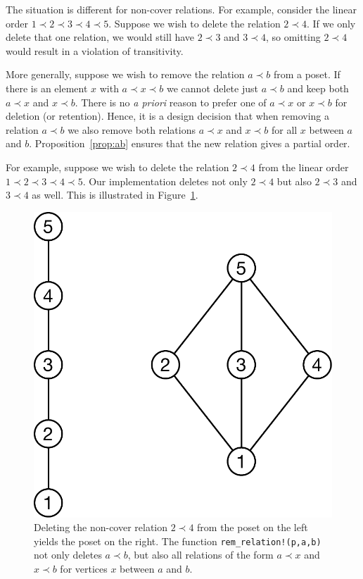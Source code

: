 \documentclass[12pt]{article}
\begin{document}
The situation is different for non-cover relations. For example,
consider the linear order $1\prec2\prec3\prec4\prec5$. Suppose we
wish to delete the relation $2\prec4$. If we only delete that one
relation, we would still have $2\prec3$ and $3\prec4$, so omitting
$2\prec4$ would result in a violation of transitivity. 

More generally, suppose we wish to remove the relation $a\prec b$ from
a poset. If there is an element $x$ with $a\prec x\prec b$ we cannot
delete just $a\prec b$ and keep both $a \prec x$ and $x\prec b$. There
is no \emph{a priori} reason to prefer one of $a\prec x$ or $x \prec
b$ for deletion (or retention). Hence, it is a design decision that
when removing a relation $a \prec b$ we also remove both relations $a
\prec x$ and $x \prec b$ for all $x$ between $a$ and
$b$. Proposition~\ref{prop:ab} ensures that the new relation gives a
partial order. 

For example, suppose we wish to delete the relation $2\prec4$ from the
linear order $1 \prec 2 \prec 3 \prec 4 \prec 5$. Our implementation
deletes not only $2\prec 4$ but also $2\prec3$ and $3\prec4$ as well. 
This is illustrated in Figure~\ref{fig:other-edge-deletion}. 
\begin{figure}[h]
  \begin{framed}
    \begin{center}
      \includegraphics[scale=0.4]{other-edge-deletion}
    \end{center}
    \caption{Deleting the non-cover relation $2\prec4$ from the poset
      on the left yields the poset on the right.  The function
      \texttt{rem\_relation!(p,a,b)} not only deletes $a\prec b$, but
      also all relations of the form $a\prec x$ and $x\prec b$ for
      vertices $x$ between $a$ and $b$.}
    \label{fig:other-edge-deletion}
  \end{framed}
\end{figure}
\end{document}
